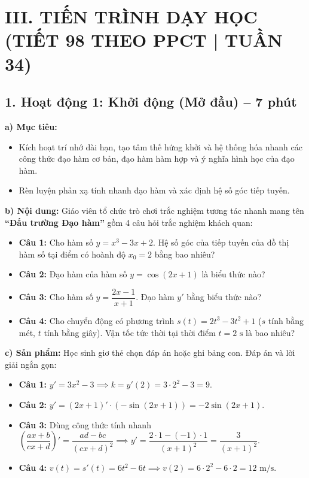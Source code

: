 \documentclass[12pt, a4paper]{article}
\begin{document}
\section*{III. TIẾN TRÌNH DẠY HỌC (TIẾT 98 THEO PPCT | TUẦN 34)}

\subsection*{1. Hoạt động 1: Khởi động (Mở đầu) -- 7 phút}

\noindent \textbf{a) Mục tiêu:}
\begin{itemize}[leftmargin=0.6cm]
    \item Kích hoạt trí nhớ dài hạn, tạo tâm thế hứng khởi và hệ thống hóa nhanh các công thức đạo hàm cơ bản, đạo hàm hàm hợp và ý nghĩa hình học của đạo hàm.
    \item Rèn luyện phản xạ tính nhanh đạo hàm và xác định hệ số góc tiếp tuyến.
\end{itemize}

\noindent \textbf{b) Nội dung:}
Giáo viên tổ chức trò chơi trắc nghiệm tương tác nhanh mang tên \textbf{``Đấu trường Đạo hàm''} gồm 4 câu hỏi trắc nghiệm khách quan:
\begin{itemize}[leftmargin=0.6cm]
    \item \textbf{Câu 1:} Cho hàm số $y = x^3 - 3x + 2$. Hệ số góc của tiếp tuyến của đồ thị hàm số tại điểm có hoành độ $x_0 = 2$ bằng bao nhiêu?
    \item \textbf{Câu 2:} Đạo hàm của hàm số $y = \cos(2x + 1)$ là biểu thức nào?
    \item \textbf{Câu 3:} Cho hàm số $y = \dfrac{2x - 1}{x + 1}$. Đạo hàm $y'$ bằng biểu thức nào?
    \item \textbf{Câu 4:} Cho chuyển động có phương trình $s(t) = 2t^3 - 3t^2 + 1$ ($s$ tính bằng mét, $t$ tính bằng giây). Vận tốc tức thời tại thời điểm $t = 2\text{ s}$ là bao nhiêu?
\end{itemize}

\noindent \textbf{c) Sản phẩm:}
Học sinh giơ thẻ chọn đáp án hoặc ghi bảng con. Đáp án và lời giải ngắn gọn:
\begin{itemize}[leftmargin=0.6cm]
    \item \textbf{Câu 1:} $y' = 3x^2 - 3 \implies k = y'(2) = 3 \cdot 2^2 - 3 = 9$.
    \item \textbf{Câu 2:} $y' = (2x + 1)' \cdot (-\sin(2x + 1)) = -2\sin(2x + 1)$.
    \item \textbf{Câu 3:} Dùng công thức tính nhanh $\left(\dfrac{ax + b}{cx + d}\right)' = \dfrac{ad - bc}{(cx + d)^2} \implies y' = \dfrac{2 \cdot 1 - (-1) \cdot 1}{(x + 1)^2} = \dfrac{3}{(x + 1)^2}$.
    \item \textbf{Câu 4:} $v(t) = s'(t) = 6t^2 - 6t \implies v(2) = 6 \cdot 2^2 - 6 \cdot 2 = 12\text{ m/s}$.
\end{itemize}
\end{document}
